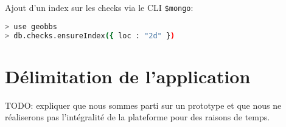 \documentclass[a4paper,12pt]{report}
\begin{document}
\begin{onehalfspace}
Ajout d'un index sur les checks via le CLI \lstinline{$mongo}:
\begin{lstlisting}[float=htb, language=bash, frame=lines, caption={Commandes à entrer dans le CLI mongo}, label={code:cliMongo}]
> use geobbs
> db.checks.ensureIndex({ loc : "2d" })
\end{lstlisting}


\chapter{Délimitation de l'application}
TODO: expliquer que nous sommes parti sur un prototype et que nous ne réaliserons pas l'intégralité de la plateforme pour des raisons de temps.

%
%
%
%
%
%
%
%








  \end{onehalfspace}
\end{document}
